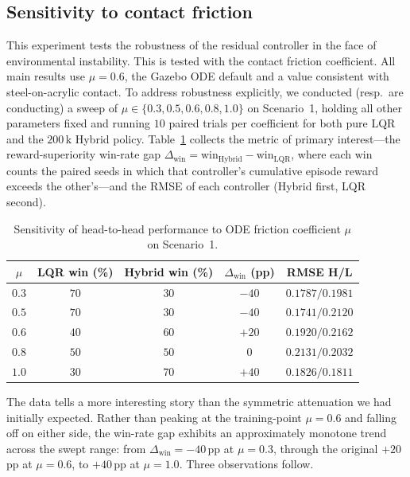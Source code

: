 \documentclass[conference]{IEEEtran}
\begin{document}
\subsection{Sensitivity to contact friction}
\label{sec:friction}
This experiment tests the robustness of the residual controller in the face of environmental instability. This is tested with the contact friction coefficient. All main results use
$\mu=0.6$, the Gazebo ODE default and a value consistent with steel-on-acrylic
contact. To address robustness explicitly, we conducted (resp.\ are conducting)
a sweep of $\mu \in \{0.3, 0.5, 0.6, 0.8, 1.0\}$ on Scenario~1, holding all
other parameters fixed and running $10$ paired trials per coefficient for
both pure LQR and the $200\,$k Hybrid policy. Table~\ref{tab:friction}
collects the metric of primary interest---the reward-superiority
win-rate gap
$\Delta_\text{win}=\text{win}_{\text{Hybrid}}-\text{win}_{\text{LQR}}$,
where each $\text{win}$ counts the paired seeds in which that
controller's cumulative episode reward exceeds the other's---and the
RMSE of each controller (Hybrid first, LQR second).

\begin{table}[t]
\centering
\caption{Sensitivity of head-to-head performance to ODE friction coefficient
$\mu$ on Scenario~1.}
\label{tab:friction}
\renewcommand{\arraystretch}{1.05}
\setlength{\tabcolsep}{4pt}
\begin{tabular}{@{}c c c c c@{}}
\toprule
$\mu$ & LQR win (\%) & Hybrid win (\%) & $\Delta_\text{win}$ (pp) & RMSE H/L \\
\midrule
$0.3$ & $70$ & $30$ & $-40$ & $0.1787 / 0.1981$ \\
$0.5$ & $70$ & $30$ & $-40$ & $0.1741 / 0.2120$ \\
$0.6$ & $40$ & $60$ & $+20$ & $0.1920 / 0.2162$ \\
$0.8$ & $50$ & $50$ & $0$   & $0.2131 / 0.2032$ \\
$1.0$ & $30$ & $70$ & $+40$ & $0.1826 / 0.1811$ \\
\bottomrule
\end{tabular}
\end{table}

The data tells a more interesting story than the symmetric attenuation
we had initially expected. Rather than peaking at the training-point
$\mu=0.6$ and falling off on either side, the win-rate gap exhibits an
approximately monotone trend across the swept range: from
$\Delta_\text{win}=-40\,$pp at $\mu=0.3$, through the original
$+20\,$pp at $\mu=0.6$, to $+40\,$pp at $\mu=1.0$. Three observations
follow.
\end{document}
